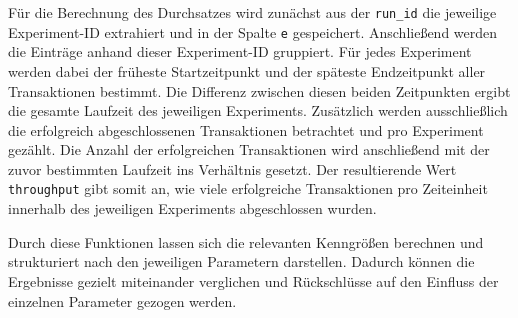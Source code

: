 Für die Berechnung des Durchsatzes wird zunächst aus der \texttt{run\_id} die jeweilige Experiment-ID extrahiert und in
der Spalte \texttt{e} gespeichert.
Anschließend werden die Einträge anhand dieser Experiment-ID gruppiert.
Für jedes Experiment werden dabei der früheste Startzeitpunkt und der späteste Endzeitpunkt aller Transaktionen
bestimmt.
Die Differenz zwischen diesen beiden Zeitpunkten ergibt die gesamte Laufzeit des jeweiligen Experiments.
Zusätzlich werden ausschließlich die erfolgreich abgeschlossenen Transaktionen betrachtet und pro Experiment gezählt.
Die Anzahl der erfolgreichen Transaktionen wird anschließend mit der zuvor bestimmten Laufzeit ins Verhältnis gesetzt.
Der resultierende Wert \texttt{throughput} gibt somit an, wie viele erfolgreiche Transaktionen pro Zeiteinheit
innerhalb des jeweiligen Experiments abgeschlossen wurden.

Durch diese Funktionen lassen sich die relevanten Kenngrößen berechnen und strukturiert nach den jeweiligen
Parametern darstellen.
Dadurch können die Ergebnisse gezielt miteinander verglichen und Rückschlüsse auf den Einfluss der
einzelnen Parameter gezogen werden.
